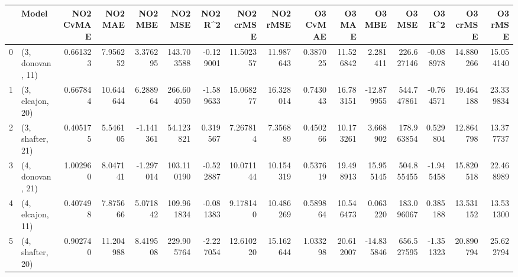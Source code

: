 \begin{tabular}{llrrrrrrrrrrrrrr}
\toprule
{} &             Model &  NO2 CvMAE &    NO2 MAE &   NO2 MBE &     NO2 MSE &   NO2 R\textasciicircum2 &  NO2 crMSE &   NO2 rMSE &  O3 CvMAE &     O3 MAE &     O3 MBE &      O3 MSE &    O3 R\textasciicircum2 &   O3 crMSE &    O3 rMSE \\
\midrule
0 &  (3, donovan, 11) &   0.661323 &   7.956252 &  3.376295 &  143.703588 & -0.129001 &  11.502357 &  11.987643 &  0.387025 &  11.526842 &   2.281411 &  226.627146 & -0.088978 &  14.880266 &  15.054140 \\
1 &  (3, elcajon, 20) &   0.667844 &  10.644644 &  6.288964 &  266.604050 & -1.589633 &  15.068277 &  16.328014 &  0.743043 &  16.783151 & -12.879955 &  544.747861 & -0.764571 &  19.464188 &  23.339834 \\
2 &  (3, shafter, 21) &   0.405175 &   5.546105 & -1.141361 &   54.123821 &  0.319567 &   7.267814 &   7.356889 &  0.450266 &  10.173261 &   3.668902 &  178.963854 &  0.529804 &  12.864798 &  13.377737 \\
3 &  (4, donovan, 21) &   1.002960 &   8.047141 & -1.297014 &  103.110190 & -0.522887 &  10.071144 &  10.154319 &  0.537619 &  19.498913 &  15.955145 &  504.855455 & -1.945458 &  15.820518 &  22.468989 \\
4 &  (4, elcajon, 11) &   0.407498 &   7.875666 &  5.071842 &  109.961834 & -0.081383 &   9.178140 &  10.486269 &  0.589864 &  10.546473 &   0.063220 &  183.096067 &  0.385188 &  13.531152 &  13.531300 \\
5 &  (4, shafter, 20) &   0.902740 &  11.204988 &  8.419508 &  229.905764 & -2.227054 &  12.610220 &  15.162644 &  1.033298 &  20.612007 & -14.835846 &  656.527595 & -1.351323 &  20.890794 &  25.622794 \\
\bottomrule
\end{tabular}
